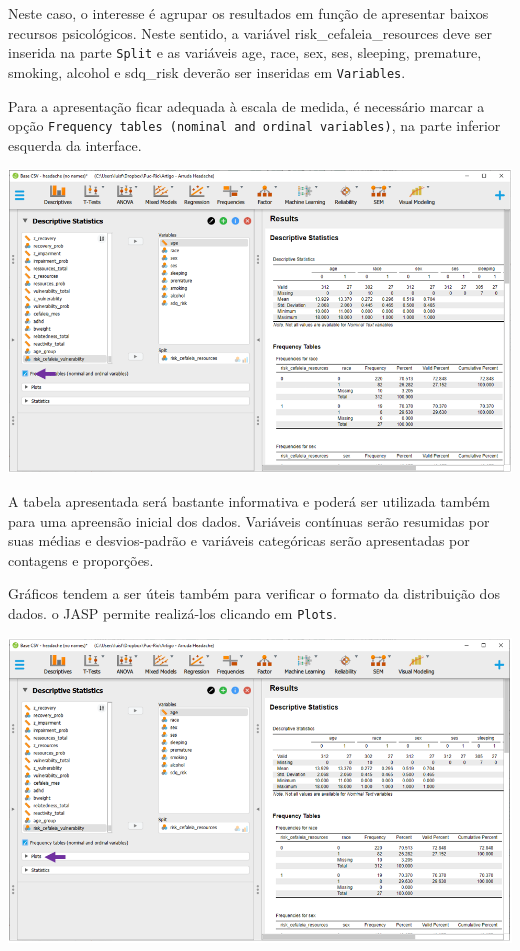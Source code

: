 \documentclass[
]{book}
\begin{document}
Neste caso, o interesse é agrupar os resultados em função de apresentar baixos recursos psicológicos. Neste sentido, a variável risk\_cefaleia\_resources deve ser inserida na parte \texttt{Split} e as variáveis age, race, sex, ses, sleeping, premature, smoking, alcohol e sdq\_risk deverão ser inseridas em \texttt{Variables}.

Para a apresentação ficar adequada à escala de medida, é necessário marcar a opção \texttt{Frequency\ tables\ (nominal\ and\ ordinal\ variables)}, na parte inferior esquerda da interface.

\includegraphics{./img/cap_logistica_descriptives2.png}

A tabela apresentada será bastante informativa e poderá ser utilizada também para uma apreensão inicial dos dados. Variáveis contínuas serão resumidas por suas médias e desvios-padrão e variáveis categóricas serão apresentadas por contagens e proporções.

Gráficos tendem a ser úteis também para verificar o formato da distribuição dos dados. o JASP permite realizá-los clicando em \texttt{Plots}.

\includegraphics{./img/cap_logistica_plots.png}
\end{document}
